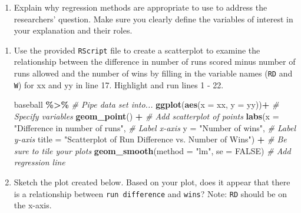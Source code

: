 \documentclass[
]{report}
\newenvironment{Shaded}{\begin{snugshade}}{\end{snugshade}}
\newcommand{\CommentTok}[1]{\textcolor[rgb]{0.56,0.35,0.01}{\textit{#1}}}
\newcommand{\DataTypeTok}[1]{\textcolor[rgb]{0.13,0.29,0.53}{#1}}
\newcommand{\KeywordTok}[1]{\textcolor[rgb]{0.13,0.29,0.53}{\textbf{#1}}}
\newcommand{\NormalTok}[1]{#1}
\newcommand{\OperatorTok}[1]{\textcolor[rgb]{0.81,0.36,0.00}{\textbf{#1}}}
\newcommand{\OtherTok}[1]{\textcolor[rgb]{0.56,0.35,0.01}{#1}}
\newcommand{\StringTok}[1]{\textcolor[rgb]{0.31,0.60,0.02}{#1}}
\providecommand{\tightlist}{%
  \setlength{\itemsep}{0pt}\setlength{\parskip}{0pt}}
\begin{document}
\begin{enumerate}
\def\labelenumi{\arabic{enumi}.}
\tightlist
\item
  Explain why regression methods are appropriate to use to address the researchers' question. Make sure you clearly define the variables of interest in your explanation and their roles.
\end{enumerate}

\newpage

\begin{enumerate}
\def\labelenumi{\arabic{enumi}.}
\setcounter{enumi}{1}
\item
  Use the provided \texttt{RScript} file to create a scatterplot to examine the relationship between the difference in number of runs scored minus number of runs allowed and the number of wins by filling in the variable names (\texttt{RD} and \texttt{W}) for xx and yy in line 17. Highlight and run lines 1 - 22.

\begin{Shaded}
\begin{Highlighting}[]
\NormalTok{baseball }\OperatorTok{\%\textgreater{}\%}\StringTok{ }\CommentTok{\# Pipe data set into...}
\KeywordTok{ggplot}\NormalTok{(}\KeywordTok{aes}\NormalTok{(}\DataTypeTok{x =}\NormalTok{ xx, }\DataTypeTok{y =}\NormalTok{ yy))}\OperatorTok{+}\StringTok{  }\CommentTok{\# Specify variables}
\StringTok{  }\KeywordTok{geom\_point}\NormalTok{() }\OperatorTok{+}\StringTok{  }\CommentTok{\# Add scatterplot of points}
\StringTok{  }\KeywordTok{labs}\NormalTok{(}\DataTypeTok{x =} \StringTok{"Difference in number of runs"}\NormalTok{,  }\CommentTok{\# Label x{-}axis}
       \DataTypeTok{y =} \StringTok{"Number of wins"}\NormalTok{,  }\CommentTok{\# Label y{-}axis}
       \DataTypeTok{title =} \StringTok{"Scatterplot of Run Difference vs. Number of Wins"}\NormalTok{) }\OperatorTok{+}\StringTok{ }\CommentTok{\# Be sure to tile your plots}
\StringTok{  }\KeywordTok{geom\_smooth}\NormalTok{(}\DataTypeTok{method =} \StringTok{"lm"}\NormalTok{, }\DataTypeTok{se =} \OtherTok{FALSE}\NormalTok{)  }\CommentTok{\# Add regression line}
\end{Highlighting}
\end{Shaded}
\item
  Sketch the plot created below. Based on your plot, does it appear that there is a relationship between \texttt{run\ difference} and \texttt{wins}? Note: \texttt{RD} should be on the x-axis.
\end{enumerate}

\vspace{2in}
\end{document}
